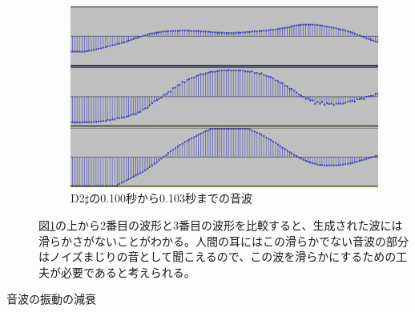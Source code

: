 \begin{description}
\begin{figure}[t]
\begin{center}
\includegraphics[width=0.7\hsize]{figure/88_88_det/d2s_0100_0103.png}
\caption{D2$\sharp$の0.100秒から0.103秒までの音波}
\label{fig:88_88_smooth}
\end{center}
\end{figure}

図\ref{fig:88_88_smooth}の上から2番目の波形と3番目の波形を比較すると、生成された波には滑らかさがないことがわかる。人間の耳にはこの滑らかでない音波の部分はノイズまじりの音として聞こえるので、この波を滑らかにするための工夫が必要であると考えられる。

\item[音波の振動の減衰]\mbox{}


\end{description}

